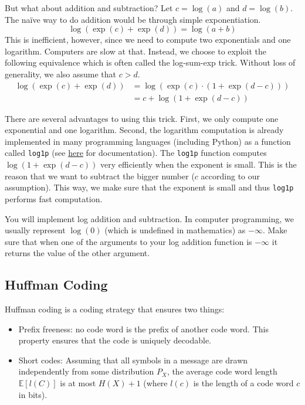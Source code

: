 \documentclass[11pt, leqno, a4paper]{article}
\begin{document}
But what about addition and subtraction? Let $ c = \log(a) $ and $ d = \log(b) $. The na\"ive way to do addition would be through simple exponentiation.
\begin{equation*}
\log(\exp(c) + \exp(d)) = \log(a + b)
\end{equation*}
This is inefficient, however, since we need to compute two exponentials and one logarithm. Computers are slow at that. Instead, we choose to exploit the
following equivalence which is often called the log-sum-exp trick. Without loss of generality, we also assume that $ c > d $.
\begin{align*}
\log(\exp(c) + \exp(d)) &= \log(\exp(c) \cdot (1 + \exp(d-c)))  \\
&= c + \log(1 + \exp(d-c)) 
\end{align*}

There are several advantages to using this trick. First, we only compute one exponential and one logarithm. Second, the logarithm computation is already 
implemented in many programming languages (including Python) as a function called \texttt{log1p} (see \href{https://docs.python.org/3/library/math.html}{here} for documentation). The \texttt{log1p} function computes $ \log(1 + \exp(d-c)) $ very efficiently when the exponent is small. This is the reason that we want to subtract
the bigger number ($ c $ according to our assumption). This way, we make sure that the exponent is small and thus \texttt{log1p} performs fast computation.

You will implement log addition and subtraction. In computer programming, we usually represent $ \log(0) $ (which is undefined in mathematics) as 
$ -\infty $. Make sure that when one of the arguments to your log addition function is $ -\infty $ it returns the value of the other argument.

\subsection{Huffman Coding}

Huffman coding is a coding strategy that ensures two things:
\begin{itemize}
\item Prefix freeness: no code word is the prefix of another code word. This property ensures that the code is uniquely decodable.
\item Short codes: Assuming that all symbols in a message are drawn independently from some distribution $ P_{X} $, the average code word
length $ \mathbb{E}\left[l(C)\right] $ is at most $ H(X) + 1 $ (where $ l(c) $ is the length of a code word $ c $ in bits).
\end{itemize}
\end{document}

